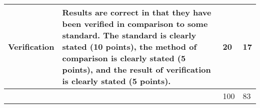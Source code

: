 \documentclass[article,12pt]{article}
\numberwithin{equation}{section}
\begin{document}
\begin{tabular}{|p{.2\linewidth}|p{.2\linewidth}|p{.2\linewidth}|p{.1\linewidth}|}
	\vspace{.2in}\textbf{Verification}        & {\tiny Results are correct in that they have been verified in comparison to some standard. The standard is clearly stated (10 points), the method of comparison is clearly stated (5 points), and the result of verification is clearly stated (5 points).}                                                                                                      & \vspace{.2in}20              &   \vspace{.2in}17    \\ \hline
	&                                                                                                                                                                                                                                                                                                                                                          & \vspace{.02in}100             &   \vspace{.02in}83     \\ \hline
\end{tabular}
\end{document}
